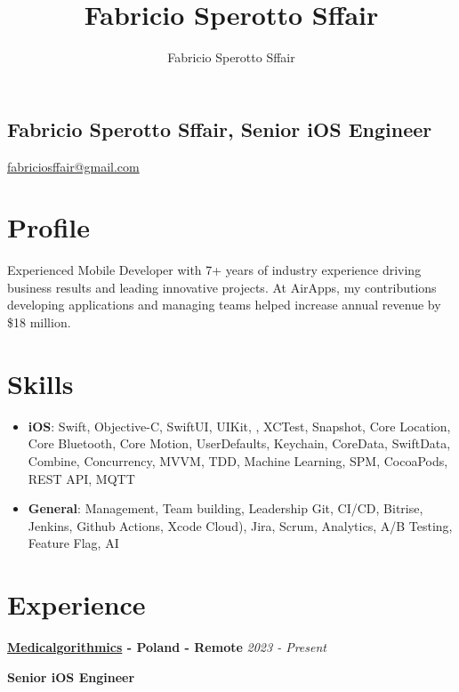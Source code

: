 \documentclass[11pt, oneside]{article}
\title{Fabricio Sperotto Sffair}
\author{Fabricio Sperotto Sffair}
\begin{document}
\begin{center}
    \section*{Fabricio Sperotto Sffair, Senior iOS Engineer}
    
    \href{https://www.linkedin.com/in/fabriciosffair/}{\faLinkedin \quad} \href{https://github.com/fabriciosffair}{\faGithub \quad}
    \href{mailto:fabriciosffair@gmail.com}{fabriciosffair@gmail.com}
\end{center}

\section*{Profile}

Experienced Mobile Developer with 7+ years of industry experience driving business results and leading innovative projects. At AirApps, my contributions developing applications and managing teams helped increase annual revenue by \$18 million.

\section*{Skills}

\begin{itemize}
    \item \textbf{iOS}: Swift, Objective-C, SwiftUI, UIKit, , XCTest, Snapshot, Core Location, Core Bluetooth, Core Motion, UserDefaults, Keychain, CoreData, SwiftData, Combine, Concurrency, MVVM, TDD, Machine Learning, SPM, CocoaPods, REST API, MQTT
    \item \textbf{General}:  Management, Team building, Leadership Git, CI/CD, Bitrise, Jenkins, Github Actions, Xcode Cloud), Jira, Scrum, Analytics, A/B Testing, Feature Flag, AI
\end{itemize}

\section*{Experience}

\textbf{\href{https://www.medicalgorithmics.com}{Medicalgorithmics} - Poland - Remote}
\hfill
\textit{2023 - Present}

\textbf{Senior iOS Engineer}
\end{document}
